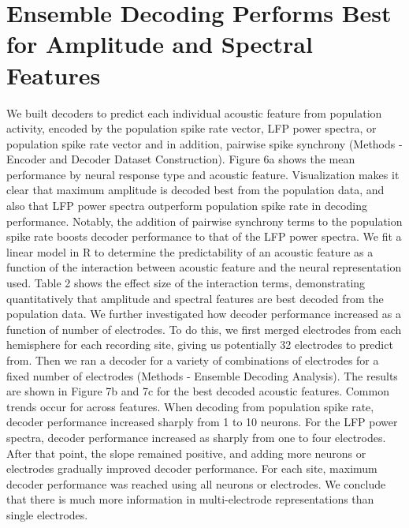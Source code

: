 \section{Ensemble Decoding Performs Best for Amplitude and Spectral Features}

   We built decoders to predict each individual acoustic feature from population activity, encoded by the population spike rate vector, LFP power spectra, or population spike rate vector and in addition, pairwise spike synchrony (Methods - Encoder and Decoder Dataset Construction). Figure 6a shows the mean performance by neural response type and acoustic feature. Visualization makes it clear that maximum amplitude is decoded best from the population data, and also that LFP power spectra outperform population spike rate in decoding performance. Notably, the addition of pairwise synchrony terms to the population spike rate boosts decoder performance to that of the LFP power spectra. We fit a linear model in R to determine the predictability of an acoustic feature as a function of the interaction between acoustic feature and the neural representation used. Table 2 shows the effect size of the interaction terms, demonstrating quantitatively that amplitude and spectral features are best decoded from the population data.
   We further investigated how decoder performance increased as a function of number of electrodes. To do this, we first merged electrodes from each hemisphere for each recording site, giving us potentially 32 electrodes to predict from. Then we ran a decoder for a variety of combinations of electrodes for a fixed number of electrodes (Methods - Ensemble Decoding Analysis). The results are shown in Figure 7b and 7c for the best decoded acoustic features. Common trends occur for across features. When decoding from population spike rate, decoder performance increased sharply from 1 to 10 neurons. For the LFP power spectra, decoder performance increased as sharply from one to four electrodes. After that point, the slope remained positive, and adding more neurons or electrodes gradually improved decoder performance. For each site, maximum decoder performance was reached using all neurons or electrodes. We conclude that there is much more information in multi-electrode representations than single electrodes.

